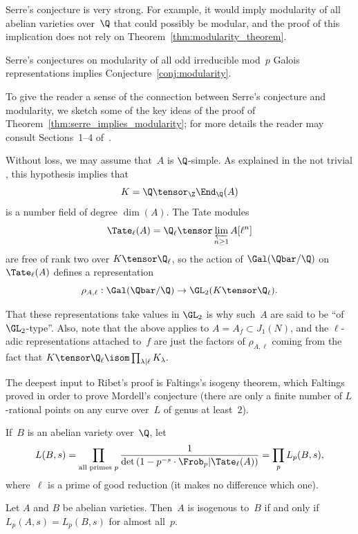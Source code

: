 \documentclass{report}
\begin{document}
Serre's conjecture is very strong.  For example, it would imply
modularity of all abelian varieties over~$\Q$ that could possibly be
modular, and the proof of this implication does not rely on
Theorem~\ref{thm:modularity_theorem}.

\begin{theorem}[Ribet]\label{thm:serre_implies_modularity}
  Serre's conjectures on modularity of all odd irreducible mod~$p$
  Galois representations implies Conjecture~\ref{conj:modularity}.
\end{theorem}

To give the reader a sense of the connection between Serre's
conjecture and modularity, we sketch some of the key ideas of the
proof of Theorem~\ref{thm:serre_implies_modularity}; for more details
the reader may consult Sections~1--4 of~\cite{ribet:abvars}.

Without loss, we may assume that~$A$ is $\Q$-simple.  As explained in
the not trivial \cite[Thm.~2.1]{ribet:abvars}, this hypothesis implies
that
$$
  K = \Q\tensor_\Z \End_{\Q}(A)
  $$
  is a number field of degree $\dim(A)$.  The Tate modules
  $$
  \Tate_\ell(A)= \Q_\ell\tensor\varprojlim_{n\geq 1} A[\ell^n]
  $$
  are free of rank two over $K\tensor\Q_{\ell}$, so the action of
  $\Gal(\Qbar/\Q)$ on $\Tate_\ell(A)$ defines a representation
  $$
  \rho_{A,\ell} : \Gal(\Qbar/\Q) \to \GL_2(K\tensor \Q_{\ell}).
  $$
\begin{remarks}
  That these representations take values in $\GL_2$ is why such~$A$
  are said to be ``of $\GL_2$-type''.  Also, note that the above
  applies to $A=A_f\subset J_1(N)$, and the $\ell$-adic
  representations attached to~$f$ are just the factors of
  $\rho_{A,\ell}$ coming from the fact that $K\tensor\Q_{\ell}\isom
  \prod_{\lambda\mid \ell} K_{\lambda}.$
\end{remarks}

The deepest input to Ribet's proof is Faltings's isogeny theorem,
which Faltings proved in order to prove Mordell's conjecture (there
are only a finite number of $L$-rational points on any curve over~$L$
of genus at least~$2$).

If~$B$ is an abelian variety over~$\Q$, let
$$
   L(B,s) = \prod_{\text{all primes }p}
\frac{1}{\det\left(1-p^{-s}\cdot \Frob_p|\Tate_{\ell}(A)\right)}
 = \prod_p L_p(B,s),
$$
 where~$\ell$ is a prime of good reduction (it makes no difference
 which one).
\begin{theorem}[Faltings]\label{thm:faltings}
  Let $A$ and $B$ be abelian varieties.  Then~$A$ is isogenous to~$B$
  if and only if $L_p(A,s) = L_p(B,s)$ for almost all~$p$.
\end{theorem}
\end{document}
